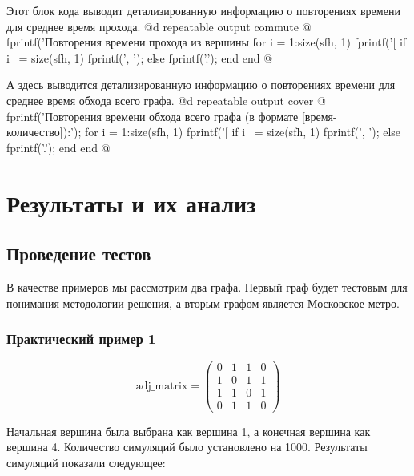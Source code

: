 \documentclass[utf8x]{G7-32} %
\begin{document}
Этот блок кода выводит детализированную информацию о повторениях времени для среднее время прохода.
@d repeatable output commute @{
fprintf('Повторения времени прохода из вершины %
    for i = 1:size(sfh, 1)
       fprintf('[%
       if i ~= size(sfh, 1)
           fprintf(', ');
       else
           fprintf('.\n');
       end
end
@}

А здесь выводится детализированную информацию о повторениях времени для среднее время обхода всего графа.
@d repeatable output cover @{
fprintf('Повторения времени обхода всего графа (в формате [время-количество]):\n');
    for i = 1:size(sfh, 1)
       fprintf('[%
       if i ~= size(sfh, 1)
           fprintf(', ');
       else
           fprintf('.\n');
       end
end
@}

\chapter{Результаты и их анализ}
\section{Проведение тестов}

В качестве примеров мы рассмотрим два графа. Первый граф будет тестовым для понимания методологии решения, а вторым графом является Московское метро.

\subsection{Практический пример 1}
\[
\text{adj_matrix} = \begin{pmatrix}
0 & 1 & 1 & 0 \\ 
1 & 0 & 1 & 1 \\ 
1 & 1 & 0 & 1 \\
0 & 1 & 1 & 0 
\end{pmatrix}
\]

Начальная вершина была выбрана как вершина 1, а конечная вершина как вершина 4. Количество симуляций было установлено на 1000. Результаты симуляций показали следующее:
\end{document}
